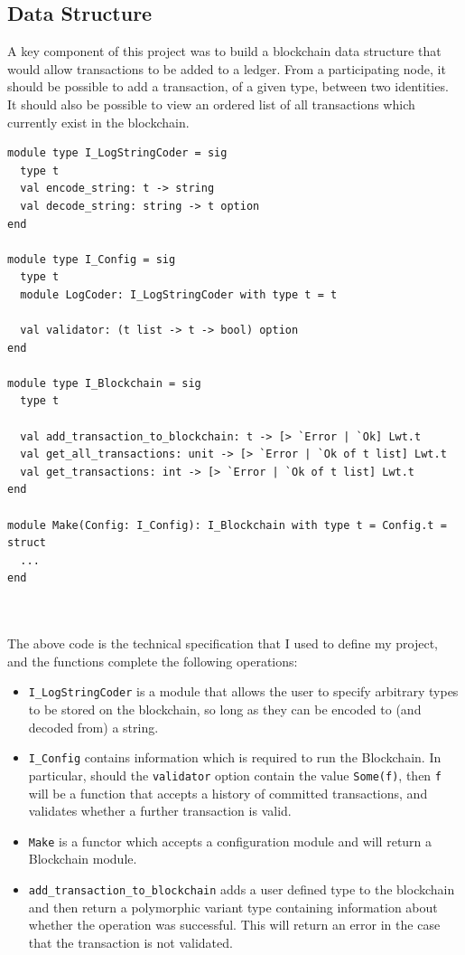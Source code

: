 \documentclass[12pt,a4paper,twoside,openright]{report}
\begin{document}
	\subsection*{Data Structure}
	A key component of this project was to build a blockchain data structure that would allow transactions to be added to a ledger. 
	From a participating node, it should be possible to add a transaction, of a given type, between two identities. 
	It should also be possible to view an ordered list of all transactions which currently exist in the blockchain.
	\begin{minipage}{\linewidth}
	\begin{lstlisting}
module type I_LogStringCoder = sig
  type t
  val encode_string: t -> string
  val decode_string: string -> t option
end

module type I_Config = sig
  type t
  module LogCoder: I_LogStringCoder with type t = t

  val validator: (t list -> t -> bool) option
end

module type I_Blockchain = sig
  type t

  val add_transaction_to_blockchain: t -> [> `Error | `Ok] Lwt.t
  val get_all_transactions: unit -> [> `Error | `Ok of t list] Lwt.t
  val get_transactions: int -> [> `Error | `Ok of t list] Lwt.t
end

module Make(Config: I_Config): I_Blockchain with type t = Config.t = struct 
  ...
end
	\end{lstlisting}
	\end{minipage}\\
	\\
	The above code is the technical specification that I used to define my project, and the functions complete the following operations:
	\begin{itemize}
		\item \texttt{I\_LogStringCoder} is a module that allows the user to specify arbitrary types to be stored on the blockchain, so long as they can be encoded to (and decoded from) a string.
		\item \texttt{I\_Config} contains information which is required to run the Blockchain.
			In particular, should the \texttt{validator} option contain the value \texttt{Some(f)}, then \texttt{f} will be a function that accepts a history of committed transactions, and validates whether a further transaction is valid. 
		\item \texttt{Make} is a functor which accepts a configuration module and will return a Blockchain module.
		\item \texttt{add\_transaction\_to\_blockchain} adds a user defined type to the blockchain and then return a polymorphic variant type containing information about whether the operation was successful. 
			This will return an error in the case that the transaction is not validated.
	\end{itemize} 
\end{document}
